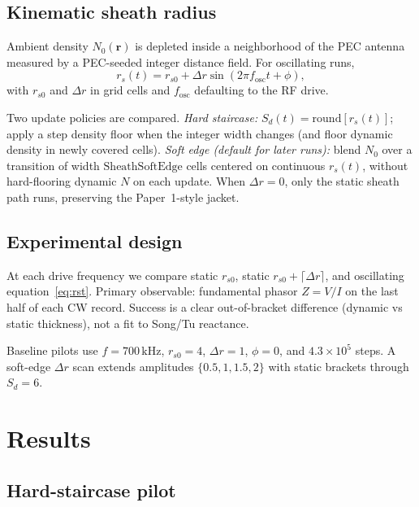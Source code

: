 \documentclass[draft]{agujournal2025}
\begin{document}
\subsection{Kinematic sheath radius}
\label{sec:rst}

Ambient density \(N_0(\mathbf{r})\) is depleted inside a neighborhood of the PEC antenna measured by a PEC-seeded integer distance field.
For oscillating runs,
\begin{equation}
r_s(t)=r_{s0}+\Delta r\sin(2\pi f_{\mathrm{osc}}t+\phi),
\label{eq:rst}
\end{equation}
with \(r_{s0}\) and \(\Delta r\) in grid cells and \(f_{\mathrm{osc}}\) defaulting to the RF drive.

Two update policies are compared.
\emph{Hard staircase:} \(S_d(t)=\mathrm{round}[r_s(t)]\); apply a step density floor when the integer width changes (and floor dynamic density in newly covered cells).
\emph{Soft edge (default for later runs):} blend \(N_0\) over a transition of width \(\mathrm{SheathSoftEdge}\) cells centered on continuous \(r_s(t)\), without hard-flooring dynamic \(N\) on each update.
When \(\Delta r=0\), only the static sheath path runs, preserving the Paper~1-style jacket.

\subsection{Experimental design}
\label{sec:design}

At each drive frequency we compare static \(r_{s0}\), static \(r_{s0}+\lceil\Delta r\rceil\), and oscillating equation~\eqref{eq:rst}.
Primary observable: fundamental phasor \(Z=V/I\) on the last half of each CW record.
Success is a clear out-of-bracket difference (dynamic vs static thickness), not a fit to Song/Tu reactance.

Baseline pilots use \(f=700\,\mathrm{kHz}\), \(r_{s0}=4\), \(\Delta r=1\), \(\phi=0\), and \(4.3\times 10^{5}\) steps.
A soft-edge \(\Delta r\) scan extends amplitudes \(\{0.5,1,1.5,2\}\) with static brackets through \(S_d=6\).

\section{Results}
\label{sec:results}

\subsection{Hard-staircase pilot}
\label{sec:hard}
\end{document}
